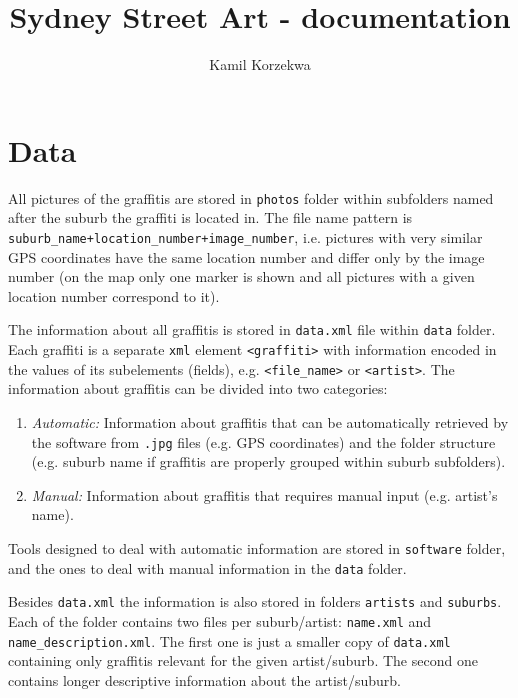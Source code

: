 \documentclass[pra,aps,onecolumn,letter,nopacs,nofootinbib,longbibliography,notitlepage]{revtex4-1}
\theoremstyle{plain}
\theoremstyle{definition}
\begin{document}
\title{Sydney Street Art - documentation}
\author{Kamil Korzekwa}

\maketitle

\section{Data}	

All pictures of the graffitis are stored in \texttt{photos} folder within subfolders named after the suburb the graffiti is located in. The file name pattern is \texttt{suburb\_name+location\_number+image\_number}, i.e. pictures with very similar GPS coordinates have the same location number and differ only by the image number (on the map only one marker is shown and all pictures with a given location number correspond to it).

The information about all graffitis is stored in \texttt{data.xml} file within \texttt{data} folder. Each graffiti is a separate \texttt{xml} element \texttt{<graffiti>} with information encoded in the values of its subelements (fields), e.g. \texttt{<file\_name>} or \texttt{<artist>}. The information about graffitis can be divided into two categories:
\begin{enumerate}
	\item \emph{Automatic:} Information about graffitis that can be automatically retrieved by the software from \texttt{.jpg} files (e.g. GPS coordinates) and the folder structure (e.g. suburb name if graffitis are properly grouped within suburb subfolders).
	\item \emph{Manual:} Information about graffitis that requires manual input (e.g. artist's name).
\end{enumerate}
Tools designed to deal with automatic information are stored in \texttt{software} folder, and the ones to deal with manual information in the \texttt{data} folder. 

Besides \texttt{data.xml} the information is also stored in folders \texttt{artists} and \texttt{suburbs}. Each of the folder contains two files per suburb/artist: \texttt{name.xml} and \texttt{name\_description.xml}. The first one is just a smaller copy of \texttt{data.xml} containing only graffitis relevant for the given artist/suburb. The second one contains longer descriptive information about the artist/suburb.
 
\end{document}
